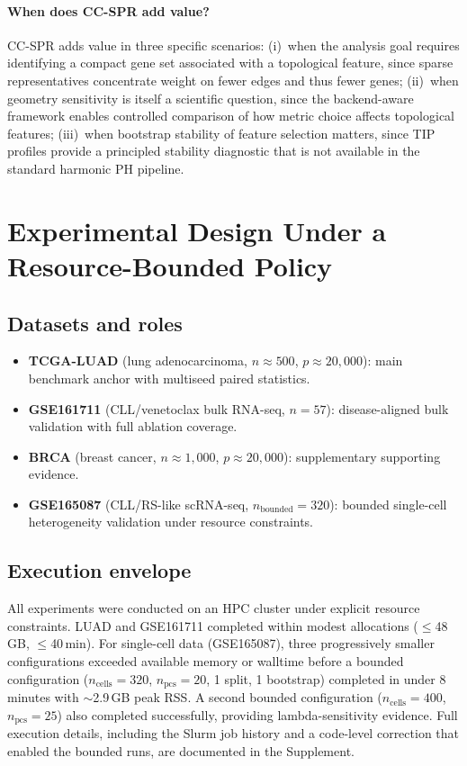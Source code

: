 \documentclass[11pt]{article}
\begin{document}
\paragraph{When does CC-SPR add value?}
CC-SPR adds value in three specific scenarios:
(i)~when the analysis goal requires identifying a compact gene set associated with a topological feature, since sparse representatives concentrate weight on fewer edges and thus fewer genes;
(ii)~when geometry sensitivity is itself a scientific question, since the backend-aware framework enables controlled comparison of how metric choice affects topological features;
(iii)~when bootstrap stability of feature selection matters, since TIP profiles provide a principled stability diagnostic that is not available in the standard harmonic PH pipeline.

\section{Experimental Design Under a Resource-Bounded Policy}
\label{sec:results}

\subsection{Datasets and roles}

\begin{itemize}[leftmargin=1.5em]
\item \textbf{TCGA-LUAD} (lung adenocarcinoma, $n \approx 500$, $p \approx 20{,}000$): main benchmark anchor with multiseed paired statistics.
\item \textbf{GSE161711} (CLL/venetoclax bulk RNA-seq, $n = 57$): disease-aligned bulk validation with full ablation coverage.
\item \textbf{BRCA} (breast cancer, $n \approx 1{,}000$, $p \approx 20{,}000$): supplementary supporting evidence.
\item \textbf{GSE165087} (CLL/RS-like scRNA-seq, $n_{\text{bounded}} = 320$): bounded single-cell heterogeneity validation under resource constraints.
\end{itemize}

\subsection{Execution envelope}

All experiments were conducted on an HPC cluster under explicit resource constraints.
LUAD and GSE161711 completed within modest allocations ($\le$48\,GB, $\le$40\,min).
For single-cell data (GSE165087), three progressively smaller configurations exceeded available memory or walltime before a bounded configuration ($n_{\text{cells}} = 320$, $n_{\text{pcs}} = 20$, 1 split, 1 bootstrap) completed in under 8 minutes with ${\sim}$2.9\,GB peak RSS.
A second bounded configuration ($n_{\text{cells}} = 400$, $n_{\text{pcs}} = 25$) also completed successfully, providing lambda-sensitivity evidence.
Full execution details, including the Slurm job history and a code-level correction that enabled the bounded runs, are documented in the Supplement.
\end{document}
